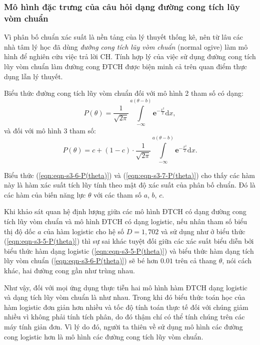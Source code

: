 \subsubsection{Mô hình đặc trưng của câu hỏi dạng đường cong tích lũy vòm chuẩn}\label{sssec:duong-cong-tich-luy}
Vì phân bố chuẩn xác suất là nền tảng của lý thuyết thống kê, nên từ lâu các nhà tâm lý học đã dùng \textit{đường cong tích lũy vòm chuẩn} (normal ogive) làm mô hình để nghiên cứu việc trả lời CH. Tính hợp lý của việc sử dụng đường cong tích lũy vòm chuẩn làm đường cong ĐTCH được biện minh cả trên quan điểm thực dụng lẫn lý thuyết.\par
Biểu thức đường cong tích lũy vòm chuẩn đối với mô hình 2 tham số có dạng:
\begin{equation}\label{eqn:eqn-s3-6-P(theta)}
	P(\theta)=\frac{1}{\sqrt{2\pi}}\int\limits_{-\infty}^{a(\theta-b)}\mathbf{e}^{-\frac{x^2}{2}}\mathrm{d}x,
\end{equation}
và đối với mô hình 3 tham số:
\begin{equation}\label{eqn:eqn-s3-7-P(theta)}
	P(\theta)=c+(1-c)\cdot\frac{1}{\sqrt{2\pi}}\int\limits_{-\infty}^{a(\theta-b)}\mathbf{e}^{-\frac{x^2}{2}}\mathrm{d}x.
\end{equation}\par
Biểu thức (\ref{eqn:eqn-s3-6-P(theta)}) và (\ref{eqn:eqn-s3-7-P(theta)}) cho thấy các hàm này là hàm xác suất tích lũy tính theo mật độ xác suất của phân bố chuẩn. Đó là các hàm của biến năng lực $\theta$ với các tham số $a$, $b$, $c$.\par
Khi khảo sát quan hệ định lượng giữa các mô hình ĐTCH có dạng đường cong tích lũy vòm chuẩn và mô hình ĐTCH có dạng logistic, nếu nhân tham số biểu thị độ dốc $a$ của hàm logistic cho hệ số $D=1,702$ và sử dụng như ở biểu thức (\ref{eqn:eqn-s3-5-P(theta)}) thì sự sai khác tuyệt đối giữa các xác suất biểu diễn bởi biểu thức hàm dạng logistic (\ref{eqn:eqn-s3-5-P(theta)}) và biểu thức hàm dạng tích lũy vòm chuẩn (\ref{eqn:eqn-s3-6-P(theta)}) sẽ bé hơn $0.01$ trên cả thang $\theta$, nói cách khác, hai đường cong gần như trùng nhau.\par
Như vậy, đối với mọi ứng dụng thực tiễn hai mô hình hàm ĐTCH dạng logistic và dạng tích lũy vòm chuẩn là như nhau. Trong khi đó biểu thức toán học của hàm logistic đơn giản hơn nhiều và tốc độ tính toán thực tế đối với chúng giảm nhiều vì không phải tính tích phân, do đó thậm chí có thể tính chúng trên các máy tính giản đơn. Vì lý do đó, người ta thiên về sử dụng mô hình các đường cong logistic hơn là mô hình các đường cong tích lũy vòm chuẩn.

